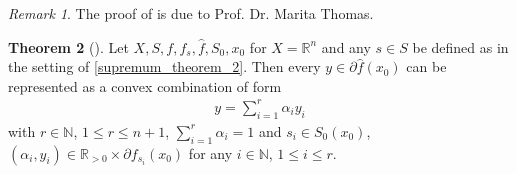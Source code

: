\documentclass[10pt, leqno]{amsart}
\theoremstyle{definition}
\newtheorem{theorem}{Theorem}[section]
\theoremstyle{remark}
\newtheorem{remark}[theorem]{Remark}
\begin{document}
    \begin{remark}
        The proof of  is due to Prof. Dr. Marita Thomas.
    \end{remark}

    \begin{theorem}[{\cite[pp. 204-205]{IoffeTihomirov}}] \label{finite_dim_representation_theorem}
        Let \(X, S, f, f_s, \hat{f}, S_0, x_0\) for \(X = \mathbb{R}^n\) and any \(s \in S\) be defined as in the setting of  \ref{supremum_theorem_2}. Then every \(y \in \partial \hat{f}(x_0)\) can be represented as a convex combination of form
        \begin{align}
            y = \sum_{i=1}^r \alpha_i y_i
        \end{align}
        with \(r \in \mathbb{N}\), \(1 \leq r \leq n+1\), \(\sum_{i=1}^r \alpha_i = 1\) and \(s_i \in S_0(x_0)\), \((\alpha_i, y_i) \in \mathbb{R}_{>0} \times \partial f_{s_i}(x_0)\) for any \(i \in \mathbb{N}\), \(1 \leq i \leq r\).
    \end{theorem}
\end{document}

